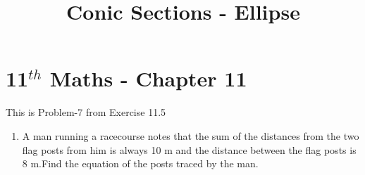 \documentclass[12pt]{article}
\begin{document}
\begin{center}
\title{\textbf{Conic Sections - Ellipse}}
\date{\vspace{-5ex}} %
\maketitle
\end{center}
\setcounter{page}{1}

\section{11$^{th}$ Maths - Chapter 11}
This is Problem-7 from Exercise 11.5
\begin{enumerate}
\item A man running a racecourse notes that the sum of the distances from the two flag posts from him is always 10 m and the distance between the flag posts is 8 m.Find the equation of the posts traced by the man. 


\end{enumerate}
\end{document}
